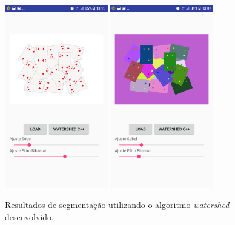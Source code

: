 \begin{figure}[!htb]
 \centering
 \def\baselinestretch{1}\small\normalsize
 \includegraphics[width=0.4\textwidth]{img/galeria_app_n4.png}\qquad
 \includegraphics[width=0.4\textwidth]{img/resultado_watershed_desenvolvido_app_n2.png} 
 \caption{\label{fig:resultado_watershed_desenvolvido_app_p2}Resultados de segmentação utilizando o algoritmo \textit{watershed} desenvolvido.}
\end{figure}

